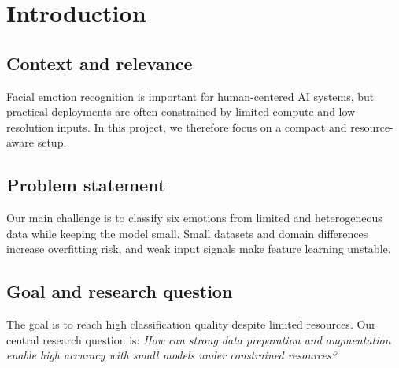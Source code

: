 \section{Introduction}
\label{sec:intro}

\subsection{Context and relevance}
Facial emotion recognition is important for human-centered AI systems, but practical deployments are often constrained by limited compute and low-resolution inputs.
In this project, we therefore focus on a compact and resource-aware setup.

\subsection{Problem statement}
Our main challenge is to classify six emotions from limited and heterogeneous data while keeping the model small.
Small datasets and domain differences increase overfitting risk, and weak input signals make feature learning unstable.

\subsection{Goal and research question}
The goal is to reach high classification quality despite limited resources.
Our central research question is: \textit{How can strong data preparation and augmentation enable high accuracy with small models under constrained resources?}
